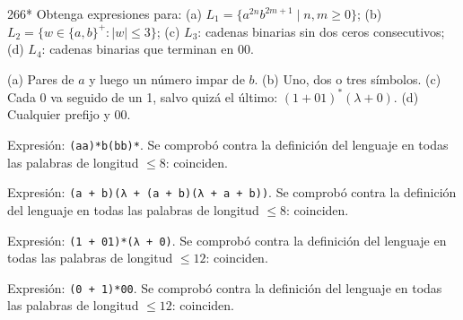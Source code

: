 \documentclass[11pt]{article}
\begin{document}
\begin{ejercicio}{266}{*}
Obtenga expresiones para: (a) $L_1 = \{a^{2n}b^{2m+1} \mid n, m \ge 0\}$; (b) $L_2 = \{w \in \{a, b\}^+ : |w| \le 3\}$; (c) $L_3$: cadenas binarias sin dos ceros consecutivos; (d) $L_4$: cadenas binarias que terminan en 00.
\end{ejercicio}
\proc (a) Pares de $a$ y luego un número impar de $b$. (b) Uno, dos o tres símbolos. (c) Cada 0 va seguido de un 1, salvo quizá el último: $(1 + 01)^*(\lambda + 0)$. (d) Cualquier prefijo y 00.\par Expresión: \texttt{(aa)*b(bb)*}. Se comprobó contra la definición del lenguaje en todas las palabras de longitud $\le 8$: coinciden.
\par Expresión: \texttt{(a + b)(λ + (a + b)(λ + a + b))}. Se comprobó contra la definición del lenguaje en todas las palabras de longitud $\le 8$: coinciden.
\par Expresión: \texttt{(1 + 01)*(λ + 0)}. Se comprobó contra la definición del lenguaje en todas las palabras de longitud $\le 12$: coinciden.
\par Expresión: \texttt{(0 + 1)*00}. Se comprobó contra la definición del lenguaje en todas las palabras de longitud $\le 12$: coinciden.
\end{document}
